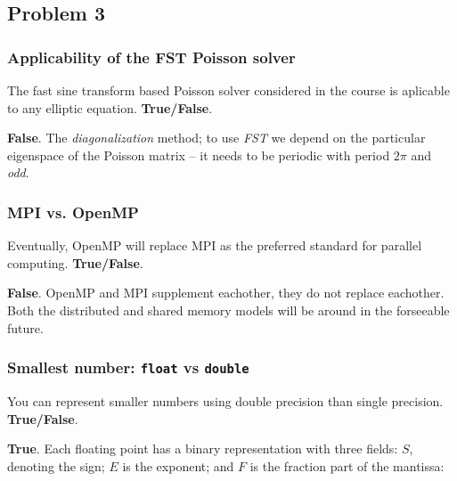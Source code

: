 \clearpage
\subsection{Problem 3} %
\label{sub:problem_3}

\subsubsection{Applicability of the FST Poisson solver} %
\label{ssub:applicability_of_fst}


\begin{question}
  The fast sine transform based Poisson solver considered in the course is aplicable to any elliptic equation. \textbf{True/False}.
\end{question}

\textbf{False}. The \emph{diagonalization} method; to use \emph{FST} we depend on the particular eigenspace of the Poisson matrix -- it needs to be periodic with period $2\pi$ and \emph{odd}.

\subsubsection{MPI vs. OpenMP} %
\label{ssub:mpi_vs_openmp}


\begin{question}
  Eventually, OpenMP will replace MPI as the preferred standard for parallel computing. \textbf{True/False}.
\end{question}

\textbf{False}. OpenMP and MPI supplement eachother, they do not replace eachother. Both the distributed and shared memory models will be around in the forseeable future.

\subsubsection{Smallest number: \texttt{float} vs \texttt{double}} %
\label{ssub:smallest_number_tt}

\begin{question}
  You can represent smaller numbers using double precision than single precision. \textbf{True/False}.
\end{question}

\textbf{True}. Each floating point has a binary representation with three fields: $S$, denoting the sign; $E$ is the exponent; and $F$ is the fraction part of the mantissa:

